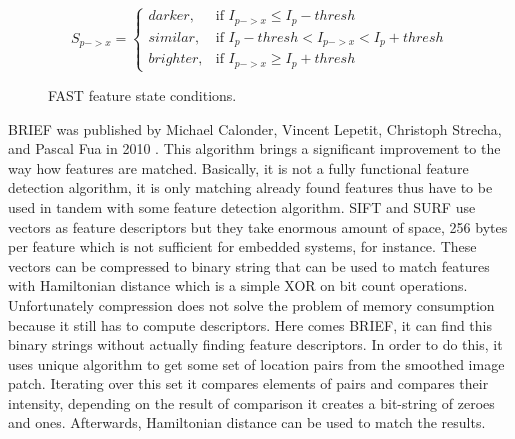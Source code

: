 \documentclass[../../../../main]{subfiles}
\begin{document}
\begin{figure} [!ht]
  \centering    
    \begin{equation}
        S_{p->x} = 
        \begin{cases} 
            darker, & \mbox{if } I_{p->x} \leq I_p-thresh \\
            similar, & \mbox{if } I_p-thresh < I_{p->x} < I_p+thresh\\
            brighter, & \mbox{if } I_{p->x} \geq I_p+thresh 
        \end{cases}
        \label{fig:fast_states}
    \end{equation}
  \caption{FAST feature state conditions.}
\end{figure}

\ac{BRIEF} was published by Michael Calonder, Vincent Lepetit, Christoph Strecha, and Pascal Fua in 2010 \cite{brief_calonder}. This algorithm brings a significant improvement to the way how features are matched. Basically, it is not a fully functional feature detection algorithm, it is only matching already found features thus have to be used in tandem with some feature detection algorithm. \ac{SIFT} and \ac{SURF} use vectors as feature descriptors but they take enormous amount of space, 256 bytes per feature which is not sufficient for embedded systems, for instance. These vectors can be compressed to binary string that can be used to match features with Hamiltonian distance which is a simple XOR on bit count operations. Unfortunately compression does not solve the problem of memory consumption because it still has to compute descriptors. Here comes \ac{BRIEF}, it can find this binary strings without actually finding feature descriptors. In order to do this, it uses unique algorithm to get some set of location pairs from the smoothed image patch. Iterating over this set it compares elements of pairs and compares their intensity, depending on the result of comparison it creates a bit-string of zeroes and ones. Afterwards, Hamiltonian distance can be used to match the results.
\end{document}
